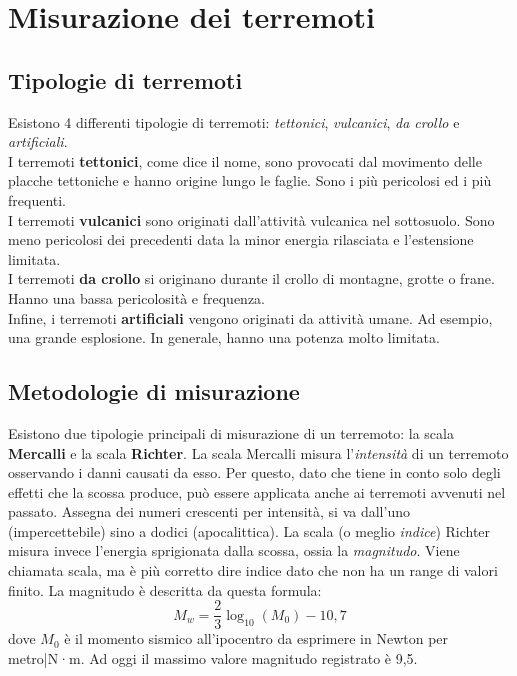 \documentclass[a4paper,10pt]{memoir}
\begin{document}
\clearpage

\section{Misurazione dei terremoti}

\subsection{Tipologie di terremoti}
Esistono 4 differenti tipologie di terremoti: \textit{tettonici}, \textit{vulcanici}, \textit{da crollo} e \textit{artificiali}.
\\
I terremoti \textbf{tettonici}, come dice il nome, sono provocati dal movimento delle placche tettoniche e hanno origine lungo le faglie.
Sono i più pericolosi ed i più frequenti.
\\
I terremoti \textbf{vulcanici} sono originati dall'attività vulcanica nel sottosuolo. Sono meno pericolosi dei precedenti data la minor energia rilasciata e l'estensione limitata.
\\
I terremoti \textbf{da crollo} si originano durante il crollo di montagne, grotte o frane. Hanno una bassa pericolosità e frequenza.
\\
Infine, i terremoti \textbf{artificiali} vengono originati da attività umane. Ad esempio, una grande esplosione. In generale, hanno una potenza molto limitata.

\subsection{Metodologie di misurazione}
Esistono due tipologie principali di misurazione di un terremoto: la scala \textbf{Mercalli} e la scala \textbf{Richter}.
La scala Mercalli misura l'\textit{intensità} di un terremoto osservando i danni causati da esso. Per questo, dato che tiene in conto solo degli effetti che la scossa produce, può essere applicata anche ai terremoti avvenuti nel passato.
Assegna dei numeri crescenti per intensità, si va dall'uno (impercettebile) sino a dodici (apocalittica).
La scala (o meglio \textit{indice}) Richter misura invece l'energia sprigionata dalla scossa, ossia la \textit{magnitudo}. Viene chiamata scala, ma è più corretto dire indice dato che non ha un range di valori finito. La magnitudo è descritta da questa formula:
\begin{equation*}
  M_w = {\frac{2}{3}}\log_{10}(M_\mathrm{0}) - 10,7
\end{equation*}
dove $M_0$ è il momento sismico all'ipocentro da esprimere in Newton per metro|N·m.\cite{measure}
Ad oggi il massimo valore magnitudo registrato è 9,5.
\end{document}
